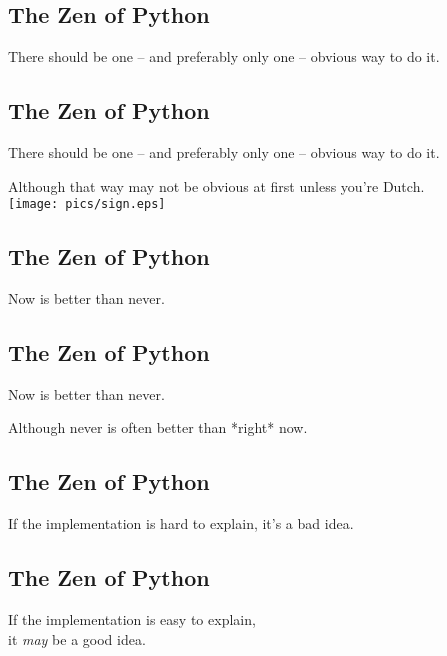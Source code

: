 \documentclass[xga]{xdvislides}
\begin{document}
\subsection{The Zen of Python}
\begin{center}
    There should be one -- and preferably only one -- obvious way to do it.
\end{center}

\subsection{The Zen of Python}
\begin{center}
    There should be one -- and preferably only one -- obvious way to do it.

\addvspace{.5in}

    Although that way may not be obvious at first unless you're Dutch. \\
\vspace*{\fill}
	\texttt{[image: pics/sign.eps]}
\end{center}


\subsection{The Zen of Python}
\begin{center}
    Now is better than never.
\end{center}

\subsection{The Zen of Python}
\begin{center}
    Now is better than never.  \\

\addvspace{.5in}

    Although never is often better than *right* now.
\end{center}

\subsection{The Zen of Python}
\begin{center}
    If the implementation is hard to explain, it's a bad idea.
\end{center}

\subsection{The Zen of Python}
\begin{center}
    If the implementation is easy to explain, \\
	it {\em may} be a good idea.
\end{center}
\end{document}
